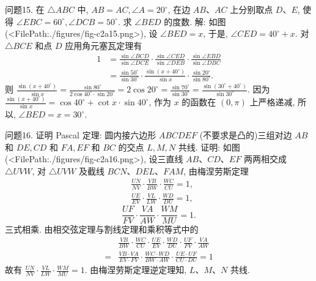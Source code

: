 问题15. 在 $\triangle A B C$ 中, $A B=A C, \angle A=20^{\circ}$, 在边 $A B 、 A C$ 上分别取点 $D 、 E$, 使得 $\angle E B C=60^{\circ}, \angle D C B=50^{\circ}$. 求 $\angle B E D$ 的度数.
解: 如图(<FilePath:./figures/fig-c2a15.png>), 设 $\angle B E D=x$, 于是, $\angle C E D=40^{\circ}+x$. 对 $\triangle B C E$ 和点 $D$ 应用角元塞瓦定理有
$$
\begin{aligned}
1 & =\frac{\sin \angle B C D}{\sin \angle D C E} \cdot \frac{\sin \angle C E D}{\sin \angle D E B} \cdot \frac{\sin \angle E B D}{\sin \angle D B C} \\
& =\frac{\sin 50^{\circ}}{\sin 30^{\circ}} \cdot \frac{\sin \left(x+40^{\circ}\right)}{\sin x} \cdot \frac{\sin 20^{\circ}}{\sin 80^{\circ}} .
\end{aligned}
$$
则 $\frac{\sin \left(x+40^{\circ}\right)}{\sin x}=\frac{\sin 80^{\circ}}{2 \cos 40^{\circ} \cdot \sin 20^{\circ}}=2 \cos 20^{\circ}=\frac{\sin 70^{\circ}}{\sin 30^{\circ}}=\frac{\sin \left(30^{\circ}+40^{\circ}\right)}{\sin 30^{\circ}}$.
因为 $\frac{\sin \left(x+40^{\circ}\right)}{\sin x}=\cos 40^{\circ}+\cot x \cdot \sin 40^{\circ}$,
作为 $x$ 的函数在 $(0, \pi)$ 上严格递减, 所以, $\angle B E D=x=30^{\circ}$.



问题16. 证明 Pascal 定理:
圆内接六边形 $A B C D E F$ (不要求是凸的)三组对边 $A B$ 和 $D E, C D$ 和 $F A, E F$ 和 $B C$ 的交点 $L, M, N$ 共线.
证明: 如图(<FilePath:./figures/fig-c2a16.png>), 设三直线 $A B 、 C D 、 E F$ 两两相交成 $\triangle U V W$, 对 $\triangle U V W$ 及截线 $B C N 、 D E L 、 F A M$, 由梅涅劳斯定理
$$
\begin{aligned}
& \frac{U N}{N V} \cdot \frac{V B}{B W} \cdot \frac{W C}{C U}=1, \\
& \frac{U E}{E V} \cdot \frac{V L}{L W} \cdot \frac{W D}{D U}=1,
\end{aligned}
$$
$$
\frac{U F}{F V} \cdot \frac{V A}{A W} \cdot \frac{W M}{M U}=1 .
$$
三式相乘.
由相交弦定理与割线定理和乘积等式中的
$$
\begin{aligned}
& \frac{V B}{B W} \cdot \frac{W C}{C U} \cdot \frac{U E}{E V} \cdot \frac{W D}{D U} \cdot \frac{U F}{F V} \cdot \frac{V A}{A W} \\
= & \frac{V B \cdot V A}{E V \cdot F V} \cdot \frac{W C \cdot W D}{B W \cdot A W} \cdot \frac{U E \cdot U F}{C U \cdot D U}=1
\end{aligned}
$$
故有 $\frac{U N}{N V} \cdot \frac{V L}{L W} \cdot \frac{W M}{M U}=1$.
由梅涅劳斯定理逆定理知, $L 、 M 、 N$ 共线.



